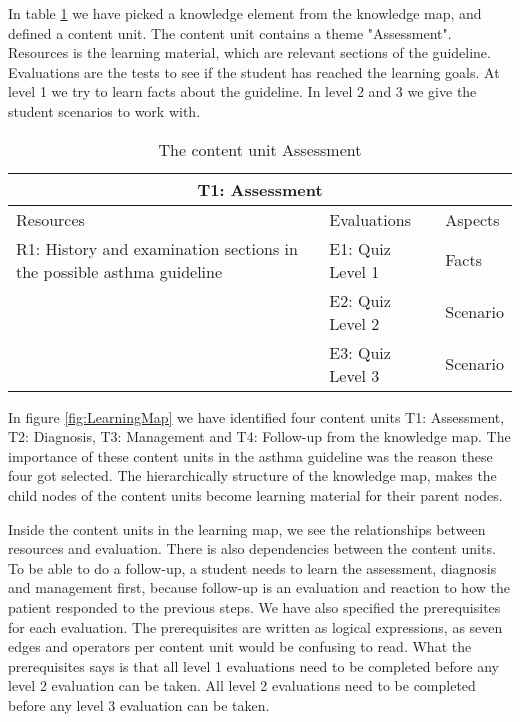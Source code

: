 In table \ref{table:ContentUnit} we have picked a knowledge element from the knowledge map, and defined a content unit. The content unit contains a theme "Assessment". Resources is the learning material, which are relevant sections of the guideline. Evaluations are the tests to see if the student has reached the learning goals. At level 1 we try to learn facts about the guideline. In level 2 and 3 we give the student scenarios to work with.

\begin{table}[h!]
	\caption{The content unit Assessment}
	\label{table:ContentUnit}
\begin{tabular}{ | m{16em} | m{10em}| m{6em} | } 
	\hline
	\multicolumn{3}{c}{\bfseries T1: Assessment} \\
	\hline
	Resources & Evaluations & Aspects \\
	\hline
	R1: History and examination sections in the possible asthma guideline \parencite{RepublicofKeny2016} & E1: Quiz Level 1 & Facts \\
	& E2: Quiz Level 2 & Scenario \\
	& E3: Quiz Level 3 & Scenario \\
	\hline
	\end{tabular}
\end{table}

In figure \ref{fig:LearningMap} we have identified four content units T1: Assessment, T2: Diagnosis, T3: Management and T4: Follow-up from the knowledge map. The importance of these content units in the asthma guideline \parencite{RepublicofKeny2016} was the reason these four got selected. The hierarchically structure of the knowledge map, makes the child nodes of the content units become learning material for their parent nodes.

Inside the content units in the learning map, we see the relationships between resources and evaluation. There is also dependencies between the content units. To be able to do a follow-up, a student needs to learn the assessment, diagnosis and management first, because follow-up is an evaluation and reaction to how the patient responded to the previous steps.  We have also specified the prerequisites for each evaluation. The prerequisites are written as logical expressions, as seven edges and operators per content unit would be confusing to read. What the prerequisites says is that all level 1 evaluations need to be completed before any level 2 evaluation can be taken. All level 2 evaluations need to be completed before any level 3 evaluation can be taken.

